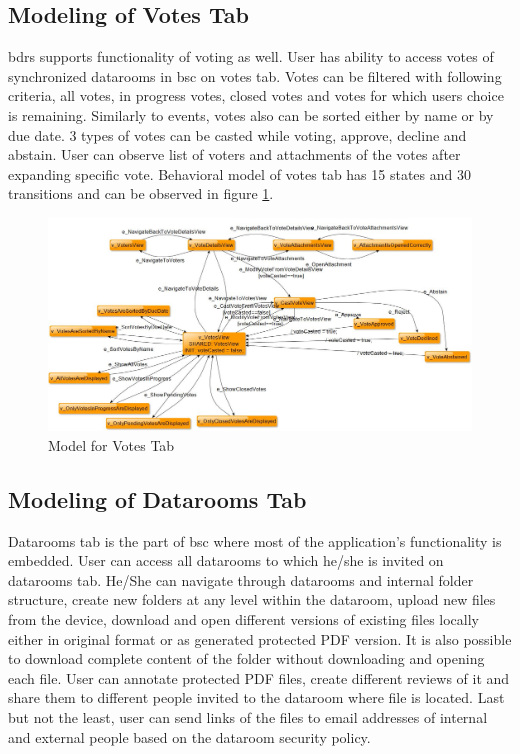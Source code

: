 \subsection{Modeling of Votes Tab}
\par
\acrshort{bdrs} supports functionality of voting as well. User has ability to access votes of synchronized datarooms in \acrshort{bsc} on votes tab. Votes can be filtered with following criteria, all votes, in progress votes, closed votes and votes for which users choice is remaining. Similarly to events, votes also can be sorted either by name or by due date. 3 types of votes can be casted while voting, approve, decline and abstain. User can observe list of voters and attachments of the votes after expanding specific vote. Behavioral model of votes tab has 15 states and 30 transitions and can be observed in figure \ref{Fig:Votes_Model_Screenshot}.

\begin{figure} [htbp!]
	\centering
					\includegraphics[width=1\textwidth]{figures/Votes_model_screenshot}
					\caption{\label{Fig:Votes_Model_Screenshot} Model for Votes Tab}
\end{figure}

\subsection{Modeling of Datarooms Tab}
\par
Datarooms tab is the part of \acrshort{bsc} where most of the application's functionality is embedded. User can access all datarooms to which he/she is invited on datarooms tab. He/She can navigate through datarooms and internal folder structure, create new folders at any level within the dataroom, upload new files from the device, download and open different versions of existing files locally either in original format or as generated protected PDF version. It is also possible to download complete content of the folder without downloading and opening each file. User can annotate protected PDF files, create different reviews of it and share them to different people invited to the dataroom where file is located. Last but not the least, user can send links of the files to email addresses of internal and external people based on the dataroom security policy.


